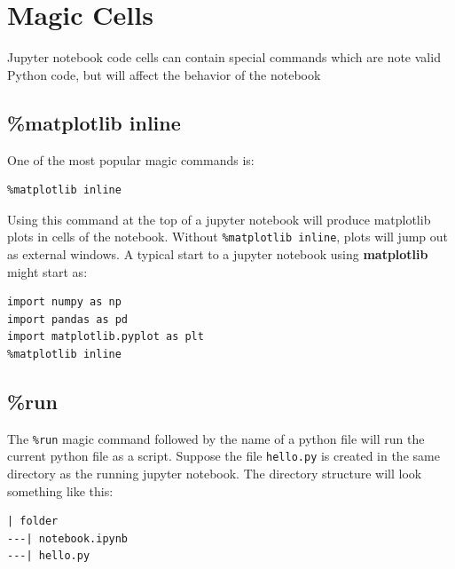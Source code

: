 \documentclass{book}
\begin{document}
    
        \section{Magic Cells}\label{magic-cells}
    




    
        Jupyter notebook code cells can contain special commands which are note
valid Python code, but will affect the behavior of the notebook
    




    
        \subsection{\%matplotlib inline}\label{matplotlib-inline}
    




    
        One of the most popular magic commands is:

\begin{lstlisting}
%matplotlib inline
\end{lstlisting}

Using this command at the top of a jupyter notebook will produce
matplotlib plots in cells of the notebook. Without
\lstinline!%matplotlib inline!, plots will jump out as external windows.
A typical start to a jupyter notebook using \textbf{matplotlib} might
start as:

\begin{lstlisting}
import numpy as np
import pandas as pd
import matplotlib.pyplot as plt
%matplotlib inline
\end{lstlisting}
    




    
        \subsection{\%run}\label{run}
    




    
        The \lstinline!%run! magic command followed by the name of a python file
will run the current python file as a script. Suppose the file
\lstinline!hello.py! is created in the same directory as the running
jupyter notebook. The directory structure will look something like this:

\begin{lstlisting}
| folder
---| notebook.ipynb
---| hello.py
\end{lstlisting}
\end{document}
